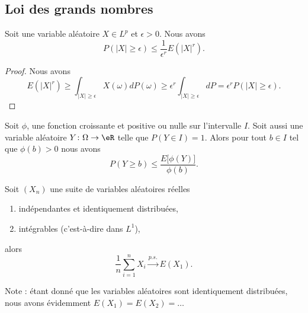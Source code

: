 \subsection{Loi des grands nombres}

\begin{lemma}
	Soit une variable aléatoire \( X\in L^p\) et \( \epsilon>0\). Nous avons
	\begin{equation}
		P(| X |\geq \epsilon)\leq \frac{1}{ \epsilon^r }E(| X |^r).
	\end{equation}
\end{lemma}

\begin{proof}
	Nous avons
	\begin{equation}
		E(| X |^r)\geq\int_{| X |\geq \epsilon}X(\omega)dP(\omega)\geq \epsilon^r\int_{| X |\geq\epsilon}dP=\epsilon^rP(| X |\geq\epsilon).
	\end{equation}
\end{proof}

\begin{corollary}   \label{CorEWhIsBB}
	Soit \( \phi\), une fonction croissante et positive ou nulle sur l'intervalle \( I\). Soit aussi une variable aléatoire \( Y\colon \Omega\to \eR\) telle que \( P(Y\in I)=1\). Alors pour tout \( b\in I\) tel que \( \phi(b)>0\) nous avons
	\begin{equation}
		P(Y\geq b)\leq \frac{ E\big[ \phi(Y) \big] }{ \phi(b) }.
	\end{equation}
\end{corollary}

\begin{theorem}     \label{ThoefQyKZ}
	Soit \( (X_n)\) une suite de variables aléatoires réelles
	\begin{enumerate}
		\item
		      indépendantes et identiquement distribuées,
		\item
		      intégrables (c'est-à-dire dans \( L^1\)),
	\end{enumerate}
	alors
	\begin{equation}
		\frac{1}{ n }\sum_{i=1}^nX_i  \stackrel{p.s.}{\longrightarrow} E(X_1).
	\end{equation}
\end{theorem}
Note : étant donné que les variables aléatoires sont identiquement distribuées, nous avons évidemment \( E(X_1)=E(X_2)=\ldots\)

